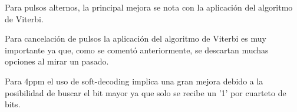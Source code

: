 Para pulsos alternos, la principal mejora se nota con la aplicación del algoritmo de Viterbi.

Para cancelación de pulsos la aplicación del algoritmo de Viterbi es muy importante ya que, como se comentó anteriormente,
se descartan muchas opciones al mirar un pasado.

Para 4ppm el uso de soft-decoding implica una gran mejora debido a la posibilidad de buscar el bit mayor ya que solo 
se recibe un '1' por cuarteto de bits.




\chapterend{}
